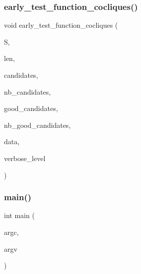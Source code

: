 \subsubsection{\texorpdfstring{early\+\_\+test\+\_\+function\+\_\+cocliques()}{early\_test\_function\_cocliques()}}
{\footnotesize\ttfamily void early\+\_\+test\+\_\+function\+\_\+cocliques (\begin{DoxyParamCaption}\item[{\mbox{\hyperlink{galois_8h_a09fddde158a3a20bd2dcadb609de11dc}{I\+NT}} $\ast$}]{S,  }\item[{\mbox{\hyperlink{galois_8h_a09fddde158a3a20bd2dcadb609de11dc}{I\+NT}}}]{len,  }\item[{\mbox{\hyperlink{galois_8h_a09fddde158a3a20bd2dcadb609de11dc}{I\+NT}} $\ast$}]{candidates,  }\item[{\mbox{\hyperlink{galois_8h_a09fddde158a3a20bd2dcadb609de11dc}{I\+NT}}}]{nb\+\_\+candidates,  }\item[{\mbox{\hyperlink{galois_8h_a09fddde158a3a20bd2dcadb609de11dc}{I\+NT}} $\ast$}]{good\+\_\+candidates,  }\item[{\mbox{\hyperlink{galois_8h_a09fddde158a3a20bd2dcadb609de11dc}{I\+NT}} \&}]{nb\+\_\+good\+\_\+candidates,  }\item[{void $\ast$}]{data,  }\item[{\mbox{\hyperlink{galois_8h_a09fddde158a3a20bd2dcadb609de11dc}{I\+NT}}}]{verbose\+\_\+level }\end{DoxyParamCaption})}

\mbox{\label{all__cliques_8_c_a3c04138a5bfe5d72780bb7e82a18e627}} 
\subsubsection{\texorpdfstring{main()}{main()}}
{\footnotesize\ttfamily int main (\begin{DoxyParamCaption}\item[{int}]{argc,  }\item[{char $\ast$$\ast$}]{argv }\end{DoxyParamCaption})}

\mbox{\label{all__cliques_8_c_a0f75338604b3e69ac0915f7fcd122ec7}} 
